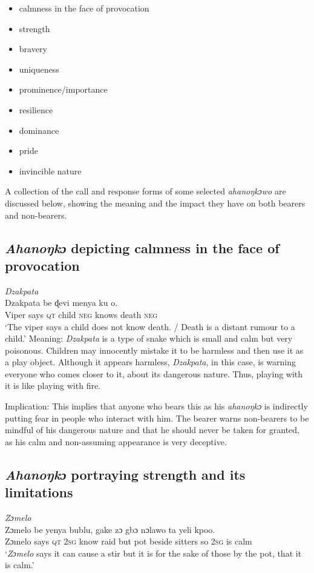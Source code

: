 \documentclass[output=paper]{langscibook}
\begin{document}
\begin{itemize}
\item calmness in the face of provocation
\item strength
\item bravery
\item uniqueness
\item prominence/importance
\item resilience
\item dominance
\item pride
\item invincible nature

\end{itemize}
A collection of the call and response forms of some selected {\textit{ahanoŋkɔwo}} are discussed below, showing the meaning and the impact they have on both bearers and non-bearers.


\subsection{{\textit{Ahanoŋkɔ}} depicting calmness in the face of provocation}
\ea
\emph{Dzakpata}\\
\gll  Dzakpata   be   ɖevi menya ku o.\\
Viper {says \textsc{qt}} child {\textsc{neg} knows} death \textsc{neg}\\
\glt  ‘The viper says a child does not know death. / Death is a distant rumour to a child.’
\z
Meaning: {\textit{Dzakpata}} is a type of snake which is small and calm but very poisonous. Children may innocently mistake it to be harmless and then use it as a play object. Although it appears harmless, {\textit{Dzakpata}}, in this case, is warning everyone who comes closer to it, about its dangerous nature. Thus, playing with it is like playing with fire.

Implication: This implies that anyone who bears this as his {\textit{ahanoŋkɔ}} is indirectly putting fear in people who interact with him. The bearer warns non-bearers to be mindful of his dangerous nature and that he should never be taken for granted, as his calm and non-assuming appearance is very deceptive.

\subsection{\textit{Ahanoŋkɔ} portraying strength and its limitations}

\ea 
 \emph{Zɔmelo}\\
\gll Zɔmelo be            yenya bublu, gake zɔ gbɔ      nɔlawo ta yeli kpoo.\\
Zɔmelo {says \textsc{qt}} {\textsc{2sg} know} raid but pot beside sitters so {\textsc{2sg} is} calm\\
\glt  ‘{\textit{Zɔmelo}} says it can cause a stir but it is for the sake of those by the pot, that it is calm.’
\z
\end{document}
